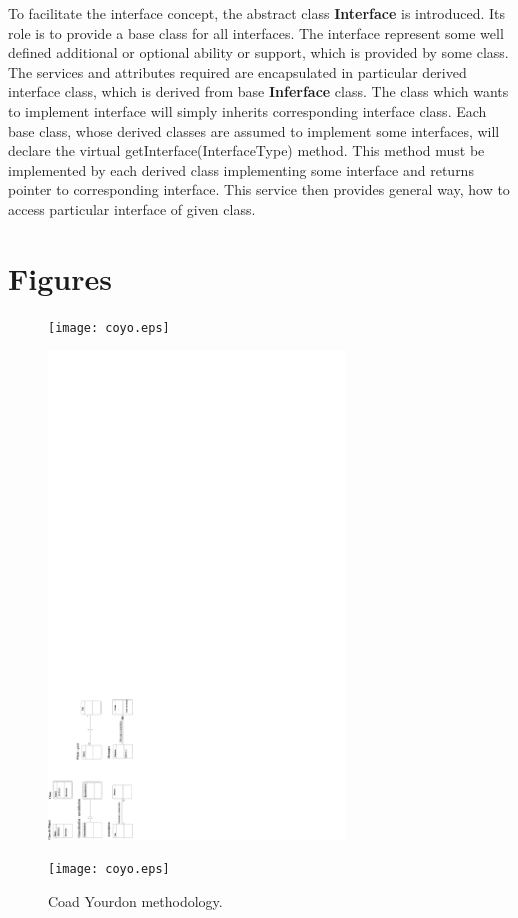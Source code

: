 \documentclass[a4paper]{article}
\newcommand{\class}[1]{{\bf #1}}
\begin{document}
To facilitate the interface concept, the abstract class
\class{Interface} is introduced. Its role is to provide a base class for all interfaces. 
The interface represent some well defined additional or optional ability or support, which is provided by some class.
The services and attributes required are encapsulated in particular
derived interface class, which is derived from base \class{Inferface} class.
The class which wants to implement interface will simply inherits corresponding interface class.
Each base class, whose derived classes are assumed to implement some interfaces, will declare
the virtual getInterface(InterfaceType) method. This method must be implemented by each derived class implementing
some interface and returns pointer to corresponding interface. This
service then provides general way, how to
access particular interface of given class. 
	
\section{Figures}

\vspace*{-10mm}
\begin{figure}[tb]
\begin{htmlonly}
  \centerline{\texttt{[image: coyo.eps]}}
\end{htmlonly}
\ifpdf
 \centerline{\includegraphics[width=0.7\textwidth]{coyo.pdf}}
\else
 \centerline{\texttt{[image: coyo.eps]}}
\fi
\caption{Coad Yourdon methodology.}
\label{coyo}
\end{figure}
\end{document}
